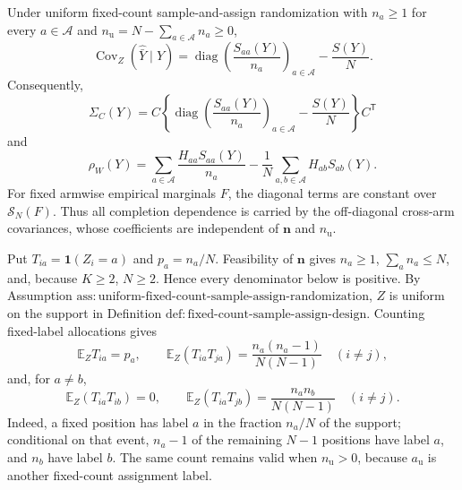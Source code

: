 Under uniform fixed-count sample-and-assign randomization with \(n_a\geq1\) for every \(a\in\mathcal A\) and \(n_{\mathrm u}=N-\sum_{a\in\mathcal A}n_a\geq0\),
\[
\operatorname{Cov}_Z(\widehat{\bar Y}\mid Y)
=\operatorname{diag}\left(\frac{S_{aa}(Y)}{n_a}\right)_{a\in\mathcal A}-\frac{S(Y)}{N}.
\]
Consequently,
\[
\Sigma_C(Y)=C\left\{\operatorname{diag}\left(\frac{S_{aa}(Y)}{n_a}\right)_{a\in\mathcal A}-\frac{S(Y)}{N}\right\}C^{\mathsf T}
\]
and
\[
\rho_W(Y)=\sum_{a\in\mathcal A}\frac{H_{aa}S_{aa}(Y)}{n_a}
-\frac1N\sum_{a,b\in\mathcal A}H_{ab}S_{ab}(Y).
\]
For fixed armwise empirical marginals \(F\), the diagonal terms are constant over \(\mathcal S_N(F)\). Thus all completion dependence is carried by the off-diagonal cross-arm covariances, whose coefficients are independent of \(\mathbf n\) and \(n_{\mathrm u}\).

Put \(T_{ia}=\mathbf 1(Z_i=a)\) and \(p_a=n_a/N\). Feasibility of \(\mathbf n\) gives \(n_a\geq1\), \(\sum_a n_a\leq N\), and, because \(K\geq2\), \(N\geq2\). Hence every denominator below is positive. By Assumption \(\mathrm{ass{:}uniform\text{-}fixed\text{-}count\text{-}sample\text{-}assign\text{-}randomization}\), \(Z\) is uniform on the support in Definition \(\mathrm{def{:}fixed\text{-}count\text{-}sample\text{-}assign\text{-}design}\). Counting fixed-label allocations gives
\[
\mathbb E_ZT_{ia}=p_a,
\qquad
\mathbb E_Z(T_{ia}T_{ja})=\frac{n_a(n_a-1)}{N(N-1)}\quad(i\ne j),
\tag{1}
\]
and, for \(a\ne b\),
\[
\mathbb E_Z(T_{ia}T_{ib})=0,
\qquad
\mathbb E_Z(T_{ia}T_{jb})=\frac{n_an_b}{N(N-1)}\quad(i\ne j).
\tag{2}
\]
Indeed, a fixed position has label \(a\) in the fraction \(n_a/N\) of the support; conditional on that event, \(n_a-1\) of the remaining \(N-1\) positions have label \(a\), and \(n_b\) have label \(b\). The same count remains valid when \(n_{\mathrm u}>0\), because \(a_{\mathrm u}\) is another fixed-count assignment label.

